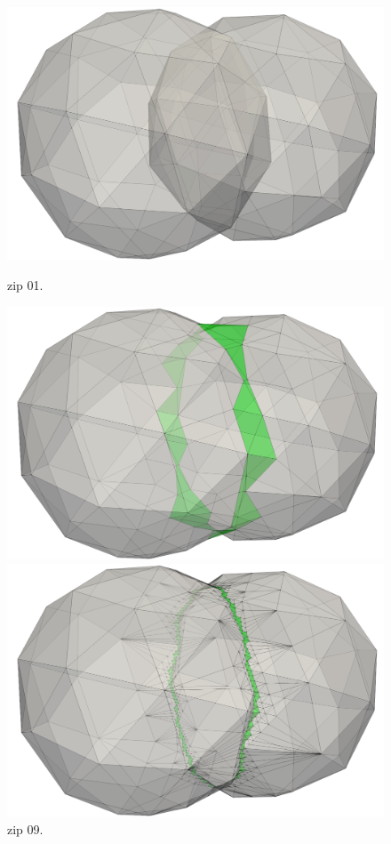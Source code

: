 \begin{figure}
  \centering
  \begin{minipage}[b]{0.32\textwidth}
    \includegraphics[width=\textwidth]{pics/pic_zip_01.png}
    \caption{zip 01.}\label{fig:pic_zip_01}
  \end{minipage}
  \hfill
  \begin{minipage}[b]{0.32\textwidth}
    \includegraphics[width=\textwidth]{pics/pic_zip_09.png}
    \caption{zip 09.}\label{fig:pic_zip_09}
  \end{minipage}
  \hfill
  \begin{minipage}[b]{0.32\textwidth}
    \includegraphics[width=\textwidth]{pics/pic_zip_15.png}

\end{minipage}
\end{figure}
